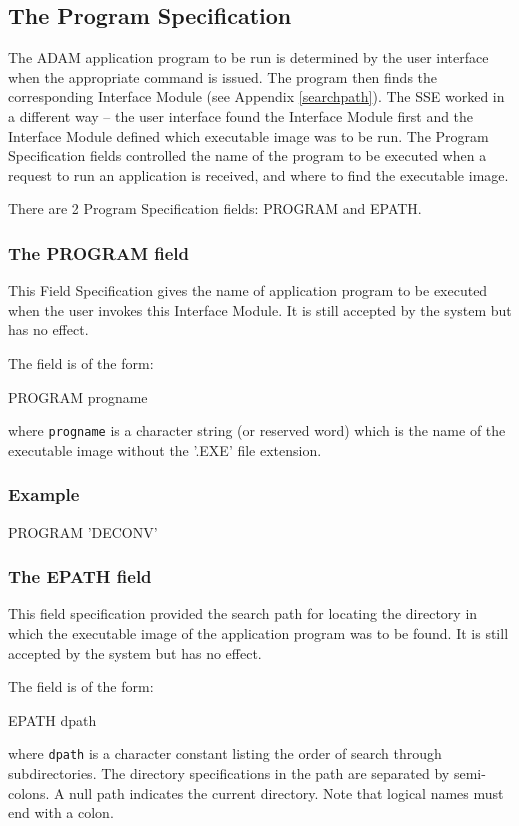 \documentclass[twoside,11pt,nolof]{starlink}
\begin{document}
\subsection{The Program Specification
\label{program}}

The ADAM application program to be run is determined by the user interface
when the appropriate command is issued.
The program then finds the corresponding Interface Module (see Appendix
\ref{searchpath}).
The SSE worked in a different way -- the user interface found the Interface
Module first and the Interface Module defined which executable image
was to be run.
The Program Specification fields controlled the name of the program to be
executed when a request to run an application is received, and where to find
the executable image.

There are 2 Program Specification fields: PROGRAM and EPATH.

\subsubsection{The PROGRAM field}
This Field Specification gives the name of application program to be executed
when the user invokes this Interface Module.
It is still accepted by the system but has no effect.

The field is of the form:
\begin{terminalv}
PROGRAM progname
\end{terminalv}
where \texttt{progname} is a character string (or reserved word) which is
the name of the executable image without the '.EXE' file extension.

\subsubsection*{Example}
\begin{terminalv}
PROGRAM 'DECONV'
\end{terminalv}

\subsubsection{The EPATH field}
This field specification provided the search path for locating the
directory in which the executable image of the application program was to be
found.
It is still accepted by the system but has no effect.

The field is of the form:
\begin{terminalv}
EPATH dpath
\end{terminalv}
where \texttt{dpath} is a character constant listing the order of search through
subdirectories. The directory specifications in the path are separated
by semi-colons. A null path indicates the current directory. Note that
logical names must end with a colon.
\end{document}
